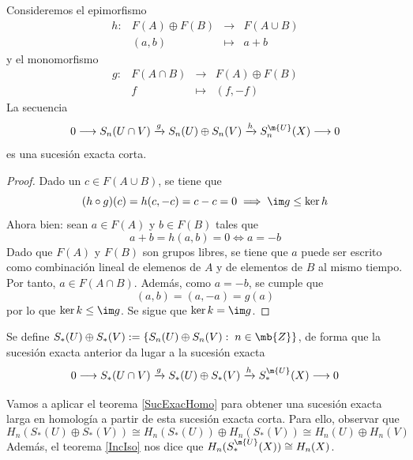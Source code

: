 Consideremos el epimorfismo
\[\begin{array}{cccc}
h:& F(A) \oplus F(B)& \longrightarrow& F(A\cup B)\\
  & (a,b)           & \longmapsto    & a+b
\end{array}\]
y el monomorfismo
\[\begin{array}{cccc}
g:& F(A\cap B)& \longrightarrow& F(A)\oplus F(B)\\
  & f           & \longmapsto    & (f,-f)
\end{array}\]
La secuencia $$0 \longrightarrow S_n(U \cap V) \xrightarrow{ g } S_n(U)\oplus S_n(V) \xrightarrow{ h } S_n^\m{U}(X) \longrightarrow 0$$ es una sucesión exacta corta.

\begin{proof}
Dado un $c \in F(A \cup B)$, se tiene que $$(h\circ g)(c)=h(c,-c)=c-c=0 \implies \im g \leq \ker h$$ Ahora bien: sean $a \in F(A)$ y $b \in F(B)$ tales que $$a+b=h(a,b)=0 \iff a=-b$$ Dado que $F(A)$ y $F(B)$ son grupos libres, se tiene que $a$ puede ser escrito como combinación lineal de elemenos de $A$ y de elementos de $B$ al mismo tiempo.
\\

Por tanto, $a \in F(A\cap B)$. Además, como $a=-b$, se cumple que $$(a,b)=(a,-a)=g(a)$$ por lo que $\ker k \leq \im g$. Se sigue que $\ker k = \im g$.
\end{proof}

Se define $S_*(U)\oplus S_*(V):=\{S_n(U)\oplus S_n(V): \; n \in \mb{Z}\}$, de forma que la sucesión exacta anterior da lugar a la sucesión exacta $$0 \longrightarrow S_*(U \cap V) \xrightarrow{ g } S_*(U)\oplus S_*(V) \xrightarrow{ h } S^\m{U}_*(X) \longrightarrow 0$$

Vamos a aplicar el teorema \ref{SucExacHomo} para obtener una sucesión exacta larga en homología a partir de esta sucesión exacta corta. Para ello, observar que $$H_n(S_*(U)\oplus S_*(V))\cong H_n(S_*(U))\oplus H_n(S_*(V))\cong H_n(U)\oplus H_n(V)$$ Además, el teorema \ref{IncIso} nos dice que $H_n(S^\m{U}_*(X)) \cong H_n(X)$.
\\



